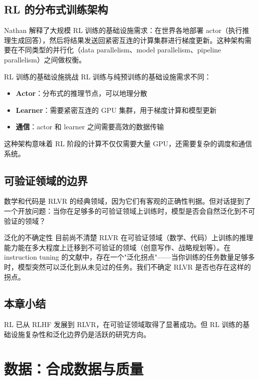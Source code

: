 \documentclass[a4paper]{article}
\begin{document}
\subsection{RL 的分布式训练架构}

Nathan 解释了大规模 RL 训练的基础设施需求：在世界各地部署 actor（执行推理生成回答），然后将结果发送回紧密互连的计算集群进行梯度更新。这种架构需要在不同类型的并行化（data parallelism、model parallelism、pipeline parallelism）之间做权衡。

\begin{knowledgebox}{RL 训练的基础设施挑战}
RL 训练与纯预训练的基础设施需求不同：
\begin{itemize}
    \item \textbf{Actor}：分布式的推理节点，可以地理分散
    \item \textbf{Learner}：需要紧密互连的 GPU 集群，用于梯度计算和模型更新
    \item \textbf{通信}：actor 和 learner 之间需要高效的数据传输
\end{itemize}
这种架构意味着 RL 阶段的计算不仅仅需要大量 GPU，还需要复杂的调度和通信系统。
\end{knowledgebox}

\subsection{可验证领域的边界}

数学和代码是 RLVR 的经典领域，因为它们有客观的正确性判据。但对话提到了一个开放问题：当你在足够多的可验证领域上训练时，模型是否会自然泛化到不可验证的领域？

\begin{warningbox}{泛化的不确定性}
目前尚不清楚 RLVR 在可验证领域（数学、代码）上训练的推理能力能在多大程度上迁移到不可验证的领域（创意写作、战略规划等）。在 instruction tuning 的文献中，存在一个"泛化拐点"——当你训练的任务数量足够多时，模型突然可以泛化到从未见过的任务。我们不确定 RLVR 是否也存在这样的拐点。
\end{warningbox}

\subsection{本章小结}

RL 已从 RLHF 发展到 RLVR，在可验证领域取得了显著成功。但 RL 训练的基础设施复杂性和泛化边界仍是活跃的研究方向。

\section{数据：合成数据与质量}
\end{document}

